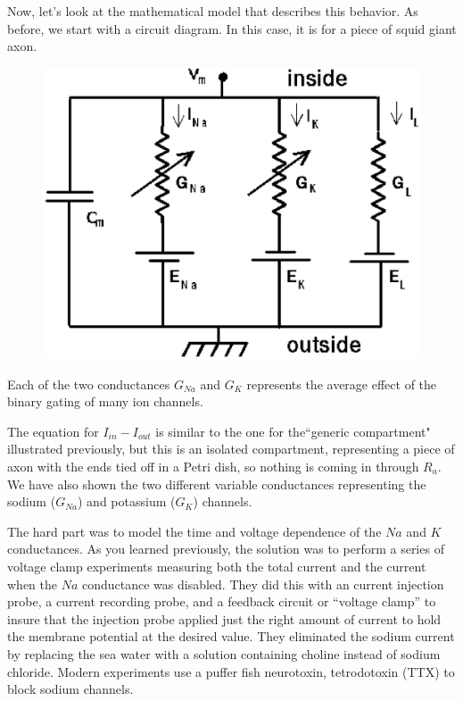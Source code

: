 \documentclass[12pt]{article}
\begin{document}
Now, let's look at the mathematical model that describes this behavior. As before, we start with a circuit diagram. In this case, it is for a piece of squid giant axon.

\begin{figure}[h]
  \centering
 \includegraphics[scale=0.75]{figs/HHcompt.eps}
  \label{fig:hhcompt}
\end{figure}

Each of the two conductances $G_{Na}$ and $G_K$ represents the average effect of the binary gating of many ion channels.

The equation for $I_{in} - I_{out}$ is similar to the one for the``generic compartment" illustrated previously, but this is an isolated compartment, representing a piece of axon with the ends tied off in a Petri dish, so nothing is coming in through $R_a$. We have also shown the two different variable conductances representing the sodium ($G_{Na}$) and potassium ($G_K$) channels.

The hard part was to model the time and voltage dependence of the $Na$ and $K$ conductances. As you learned previously, the solution was to perform a series of voltage clamp experiments measuring both the total current and the current when the $Na$ conductance was disabled. They did this with an current injection probe, a current recording probe, and a feedback circuit or ``voltage clamp'' to insure that the injection probe applied just the right amount of current to hold the membrane potential at the desired value. They eliminated the sodium current by replacing the sea water with a solution containing choline instead of sodium chloride. Modern experiments use a puffer fish neurotoxin, tetrodotoxin (TTX) to block sodium channels.
\end{document}

